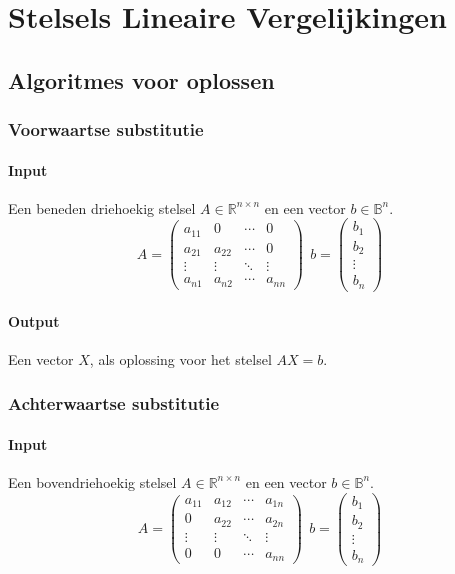 \documentclass[samenvatting.tex]{subfiles}
\begin{document}
\chapter{Stelsels Lineaire Vergelijkingen}

\section{Algoritmes voor oplossen}
\subsection{Voorwaartse substitutie}
\subsubsection*{Input}
Een beneden driehoekig stelsel $A \in \mathbb{R}^{n\times n}$ en een vector $b \in \mathbb{B}^{n}$.
\[
A =
\begin{pmatrix}
a_{11} & 0 & \cdots & 0\\
a_{21} & a_{22} & \cdots & 0\\
\vdots & \vdots & \ddots & \vdots\\
a_{n1} & a_{n2} & \cdots & a_{nn}
\end{pmatrix}
\ { }\ 
b =
\begin{pmatrix}
b_{1}\\b_{2}\\\vdots\\b_{n}
\end{pmatrix}
\]
\subsubsection*{Output}
Een vector $X$, als oplossing voor het stelsel $AX=b$.

\subsection{Achterwaartse substitutie}
\subsubsection*{Input}
Een bovendriehoekig stelsel $A \in \mathbb{R}^{n\times n}$ en een vector $b \in \mathbb{B}^{n}$.
\[
A =
\begin{pmatrix}
a_{11} & a_{12} & \cdots & a_{1n}\\
0 & a_{22} & \cdots & a_{2n}\\
\vdots & \vdots & \ddots & \vdots\\
0 & 0 & \cdots & a_{nn}
\end{pmatrix}
\ { }\ 
b =
\begin{pmatrix}
b_{1}\\b_{2}\\\vdots\\b_{n}
\end{pmatrix}
\]
\end{document}

